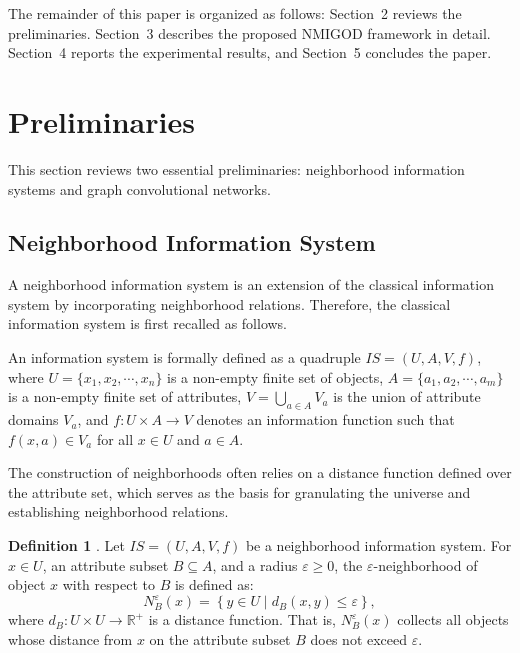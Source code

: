 \documentclass[lettersize,journal]{IEEEtran}
\begin{document}
The remainder of this paper is organized as follows: Section~2 reviews the preliminaries. Section~3
describes the proposed NMIGOD framework in detail. Section~4 reports the experimental results, and
Section~5 concludes the paper.

\section{Preliminaries}
This section reviews two essential preliminaries: neighborhood information systems and graph
convolutional networks.

\subsection{Neighborhood Information System}

A neighborhood information system is an extension of the classical information system by incorporating
neighborhood relations. Therefore, the classical information system is first recalled as follows.

An information system is formally defined as a quadruple \(IS = (U, A, V, f)\), where
\(U = \{x_{1}, x_{2}, \cdots, x_{n}\}\) is a non-empty finite set of objects,
\(A = \{a_{1}, a_{2}, \cdots, a_{m}\}\) is a non-empty finite set of attributes,
\(V = \bigcup_{a \in A} V_{a}\) is the union of attribute domains \(V_{a}\), and
\(f: U \times A \rightarrow V\) denotes an information function such that \(f(x,a) \in V_{a}\) for all
\(x \in U\) and \(a \in A\).

The construction of neighborhoods often relies on a distance function defined over the attribute set,
which serves as the basis for granulating the universe and establishing neighborhood relations.

\textbf{Definition 1} \cite{ref14}. Let \(IS = (U, A, V, f)\) be a neighborhood information system.
For \(x \in U\), an attribute subset \(B \subseteq A\), and a radius \(\varepsilon \geq 0\), the
\(\varepsilon\)-neighborhood of object \(x\) with respect to \(B\) is defined as:
\begin{equation}
N_{B}^{\varepsilon}(x) = \left\{ y \in U \mid d_{B}(x, y) \leq \varepsilon \right\},
\end{equation}
where \(d_{B}: U \times U \rightarrow \mathbb{R}^{+}\) is a distance function. That is,
\(N_{B}^{\varepsilon}(x)\) collects all objects whose distance from \(x\) on the attribute subset \(B\)
does not exceed \(\varepsilon\).
\end{document}
